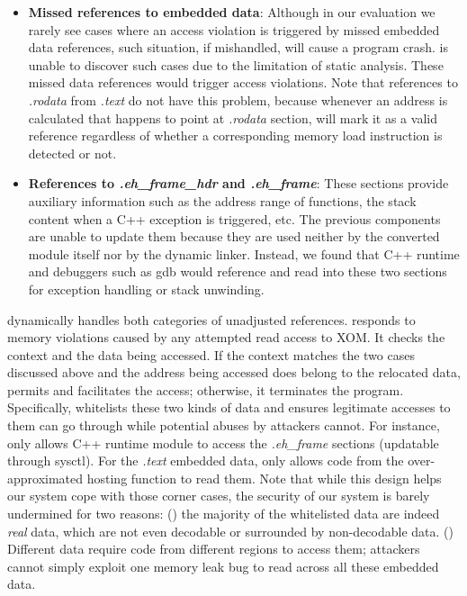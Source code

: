 \begin{itemize}
\item
{\bf Missed references to embedded data}:
Although in our evaluation we rarely see cases where an access violation is triggered by missed embedded data references, such situation, if mishandled, will cause a program crash. 
\NDisassembler is unable to discover such cases due to the limitation of static analysis.
These missed data references would trigger access violations. Note that references to \textit{.rodata} from \textit{.text} do not have this problem, because whenever an address is calculated that happens to point at \textit{.rodata} section, \NDisassembler will mark it as a valid reference regardless of whether a corresponding memory load instruction is detected or not. 
\item
{\bf References to \textit{.eh\_frame\_hdr} and \textit{.eh\_frame}}: 
These sections provide auxiliary information such as the address range of functions, the stack content when a C++ exception is triggered, etc. The previous components are unable to update them because they are used neither by the converted module itself nor by the dynamic linker. Instead, we found that C++ runtime and debuggers such as gdb would reference and read into these two sections for exception handling or stack unwinding.

\end{itemize}

\NMonitor dynamically handles both categories of unadjusted references. \NMonitor responds to memory violations caused by any attempted read access to XOM. It checks the context and the data being accessed. If the context matches the two cases discussed above and the address being accessed does belong to the relocated data, \NMonitor permits and facilitates the access; otherwise, it terminates the program. 
Specifically, \NMonitor whitelists these two kinds of data and ensures legitimate accesses to them can go through while potential abuses by attackers cannot. 
For instance, \NMonitor only allows C++ runtime module to access the \textit{.eh\_frame} sections (updatable through sysctl). 
For the \emph{.text} embedded data, \NMonitor only allows code from the over-approximated hosting function to read them.
Note that while this design helps our system cope with those corner cases, the security of our system is barely undermined for two reasons: ()  the majority of the whitelisted data are indeed \emph{real} data, which are not even decodable or surrounded by non-decodable data. () Different data require code from different regions to access them; attackers cannot simply exploit one memory leak bug to read across all these embedded data. 
